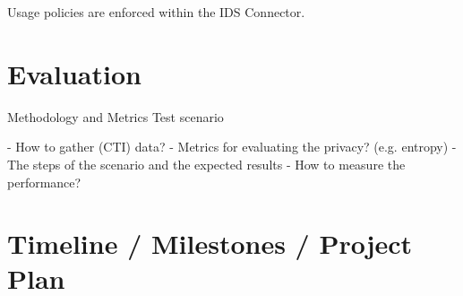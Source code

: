 \documentclass{article}
\begin{document}
Usage policies are enforced within the IDS Connector. 



\section{Evaluation} %
Methodology and Metrics
Test scenario

- How to gather (CTI) data?
- Metrics for evaluating the privacy? (e.g. entropy)
- The steps of the scenario and the expected results
- How to measure the performance?


\section{Timeline / Milestones / Project Plan} %

 

\end{document}
